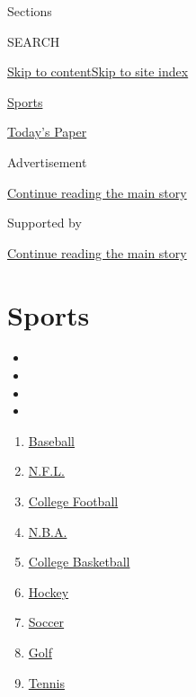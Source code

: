 Sections

SEARCH

\protect\hyperlink{site-content}{Skip to
content}\protect\hyperlink{site-index}{Skip to site index}

\href{https://www.nytimes3xbfgragh.onion/section/sports}{Sports}

\href{https://myaccount.nytimes3xbfgragh.onion/auth/login?response_type=cookie\&client_id=vi}{}

\href{https://www.nytimes3xbfgragh.onion/section/todayspaper}{Today's
Paper}

Advertisement

\protect\hyperlink{after-top}{Continue reading the main story}

Supported by

\protect\hyperlink{after-sponsor}{Continue reading the main story}

\hypertarget{sports}{%
\section{Sports}\label{sports}}

\begin{itemize}
\item
\item
\item
\item
\end{itemize}

\begin{enumerate}
\def\labelenumi{\arabic{enumi}.}
\tightlist
\item
  \href{/section/sports/baseball}{Baseball}
\item
  \href{/section/sports/football}{N.F.L.}
\item
  \href{/section/sports/ncaafootball}{College Football}
\item
  \href{/section/sports/basketball}{N.B.A.}
\item
  \href{/section/sports/ncaabasketball}{College Basketball}
\item
  \href{/section/sports/hockey}{Hockey}
\item
  \href{/section/sports/soccer}{Soccer}
\item
  \href{/section/sports/golf}{Golf}
\item
  \href{/section/sports/tennis}{Tennis}
\end{enumerate}


